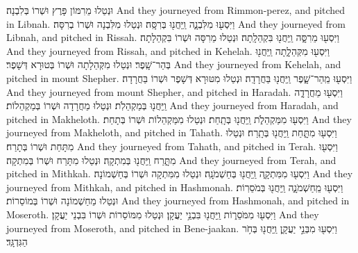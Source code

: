 {וּנְטַלוּ מֵרִמּוֹן פָּרֶץ וּשְׁרוֹ בְּלִבְנָה׃}
{And they journeyed from Rimmon-perez, and pitched in Libnah.}{}
{וַיִּסְע֖וּ מִלִּבְנָ֑ה וַֽיַּחֲנ֖וּ בְּרִסָּֽה׃}
{וּנְטַלוּ מִלִּבְנָה וּשְׁרוֹ בְרִסָּה׃}
{And they journeyed from Libnah, and pitched in Rissah.}{}
{וַיִּסְע֖וּ מֵרִסָּ֑ה וַֽיַּחֲנ֖וּ בִּקְהֵלָֽתָה׃}
{וּנְטַלוּ מֵרִסָּה וּשְׁרוֹ בִּקְהֵלָתָה׃}
{And they journeyed from Rissah, and pitched in Kehelah.}{}
{וַיִּסְע֖וּ מִקְּהֵלָ֑תָה וַֽיַּחֲנ֖וּ בְּהַר־שָֽׁפֶר׃}
{וּנְטַלוּ מִקְּהֵלָתָה וּשְׁרוֹ בְּטוּרָא דְּשָׁפֶר׃}
{And they journeyed from Kehelah, and pitched in mount Shepher.}{}
{וַיִּסְע֖וּ מֵֽהַר־שָׁ֑פֶר וַֽיַּחֲנ֖וּ בַּחֲרָדָֽה׃}
{וּנְטַלוּ מִטּוּרָא דְּשָׁפֶר וּשְׁרוֹ בַּחֲרָדָה׃}
{And they journeyed from mount Shepher, and pitched in Haradah.}{}
{וַיִּסְע֖וּ מֵחֲרָדָ֑ה וַֽיַּחֲנ֖וּ בְּמַקְהֵלֹֽת׃}
{וּנְטַלוּ מֵחֲרָדָה וּשְׁרוֹ בְּמַקְהֵלוֹת׃}
{And they journeyed from Haradah, and pitched in Makheloth.}{}
{וַיִּסְע֖וּ מִמַּקְהֵלֹ֑ת וַֽיַּחֲנ֖וּ בְּתָֽחַת׃}
{וּנְטַלוּ מִמַּקְהֵלוֹת וּשְׁרוֹ בְּתָחַת׃}
{And they journeyed from Makheloth, and pitched in Tahath.}{}
{וַיִּסְע֖וּ מִתָּ֑חַת וַֽיַּחֲנ֖וּ בְּתָֽרַח׃}
{וּנְטַלוּ מִתָּחַת וּשְׁרוֹ בְּתָרַח׃}
{And they journeyed from Tahath, and pitched in Terah.}{}
{וַיִּסְע֖וּ מִתָּ֑רַח וַֽיַּחֲנ֖וּ בְּמִתְקָֽה׃}
{וּנְטַלוּ מִתָּרַח וּשְׁרוֹ בְּמִתְקָה׃}
{And they journeyed from Terah, and pitched in Mithkah.}{}
{וַיִּסְע֖וּ מִמִּתְקָ֑ה וַֽיַּחֲנ֖וּ בְּחַשְׁמֹנָֽה׃}
{וּנְטַלוּ מִמִּתְקָה וּשְׁרוֹ בְּחַשְׁמוֹנָה׃}
{And they journeyed from Mithkah, and pitched in Hashmonah.}{}
{וַיִּסְע֖וּ מֵֽחַשְׁמֹנָ֑ה וַֽיַּחֲנ֖וּ בְּמֹסֵרֽוֹת׃}
{וּנְטַלוּ מֵחַשְׁמוֹנָה וּשְׁרוֹ בְּמוֹסֵרוֹת׃}
{And they journeyed from Hashmonah, and pitched in Moseroth.}{}
{וַיִּסְע֖וּ מִמֹּסֵר֑וֹת וַֽיַּחֲנ֖וּ בִּבְנֵ֥י יַעֲקָֽן׃}
{וּנְטַלוּ מִמּוֹסֵרוֹת וּשְׁרוֹ בִּבְנֵי יַעֲקָן׃}
{And they journeyed from Moseroth, and pitched in Bene-jaakan.}{}
{וַיִּסְע֖וּ מִבְּנֵ֣י יַעֲקָ֑ן וַֽיַּחֲנ֖וּ בְּחֹ֥ר הַגִּדְגָּֽד׃}
